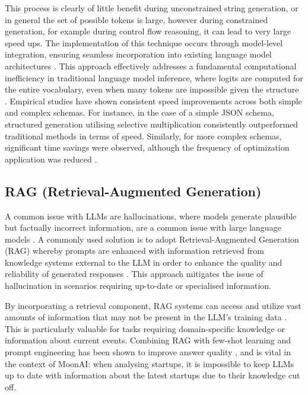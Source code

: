 \documentclass[a4paper, oneside]{discothesis}
\begin{document}
This process is clearly of little benefit during unconstrained string generation, or in general the set of possible tokens is large, however during constrained generation, for example during control flow reasoning, it can lead to very large speed ups. The implementation of this technique occurs through model-level integration, ensuring seamless incorporation into existing language model architectures \cite{chaudhari2023logit}. This approach effectively addresses a fundamental computational inefficiency in traditional language model inference, where logits are computed for the entire vocabulary, even when many tokens are impossible given the structure \cite{willard2023efficient}. Empirical studies have shown consistent speed improvements across both simple and complex schemas. For instance, in the case of a simple JSON schema, structured generation utilising selective multiplication consistently outperformed traditional methods in terms of speed. Similarly, for more complex schemas, significant time savings were observed, although the frequency of optimization application was reduced \cite{chaudhari2023logit}.

\subsection{RAG (Retrieval-Augmented Generation)}
A common issue with LLMs are hallucinations, where models generate plausible but factually incorrect information, are a common issue with large language models \cite{maynez2020faithfulness}. A commonly used solution is to adopt Retrieval-Augmented Generation (RAG) whereby prompts are enhanced with information retrieved from knowledge systems external to the LLM in order to enhance the quality and reliability of generated responses \cite{lewis2020retrieval}. This approach mitigates the issue of hallucination in scenarios requiring up-to-date or specialised information.

By incorporating a retrieval component, RAG systems can access and utilize vast amounts of information that may not be present in the LLM's training data \cite{lewis2020retrieval}. This is particularly valuable for tasks requiring domain-specific knowledge or information about current events.
Combining RAG with few-shot learning and prompt engineering has been shown to improve answer quality \cite{liu2021pre}, and is vital in the context of MoonAI: when analysing startups, it is impossible to keep LLMs up to date with information about the latest startups due to their knowledge cut off.
\end{document}
